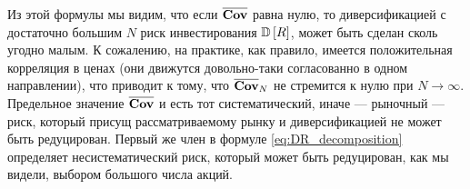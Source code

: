 Из этой формулы мы видим, что если $\overline{\textbf{Cov}}$ равна нулю, то диверсификацией с достаточно большим $N$ риск инвестирования
$\mathbb{D}\left[R\right]$, может быть сделан сколь угодно малым. К сожалению, на практике, как правило, имеется положительная корреляция в ценах
(они движутся довольно-таки согласованно в одном направлении), что приводит к тому, что
$\overline{\textbf{Cov}}_N$ не стремится к нулю при $N \rightarrow \infty$. Предельное значение $\overline{\textbf{Cov}}$ и есть тот систематический,
иначе --- рыночный --- риск, который присущ рассматриваемому рынку и диверсификацией не может быть редуцирован. Первый же член в формуле
\ref{eq:DR_decomposition} определяет несистематический риск, который может быть редуцирован, как мы видели, выбором большого числа акций.